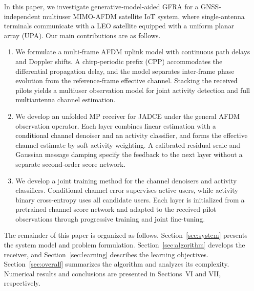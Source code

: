 In this paper, we investigate generative-model-aided GFRA for a
GNSS-independent multiuser MIMO-AFDM satellite IoT system, where
single-antenna terminals communicate with a LEO satellite equipped with
a uniform planar array (UPA). Our main contributions are as follows.
\begin{enumerate}[label=\arabic*)]
\item We formulate a multi-frame AFDM uplink model with continuous path
delays and Doppler shifts. A chirp-periodic prefix (CPP) accommodates
the differential propagation delay, and the model separates
inter-frame phase evolution from the reference-frame effective
channel. Stacking the received pilots yields a multiuser observation
model for joint activity detection and full multiantenna channel
estimation.

\item We develop an unfolded MP receiver for JADCE under the general
AFDM observation operator. Each layer combines linear estimation with
a conditional channel denoiser and an activity classifier, and forms
the effective channel estimate by soft activity weighting. A calibrated
residual scale and Gaussian message damping specify the feedback to
the next layer without a separate second-order score network.

\item We develop a joint training method for the channel denoisers
and activity classifiers. Conditional channel error supervises active
users, while activity binary cross-entropy uses all candidate users.
Each layer is initialized from a pretrained channel score network and
adapted to the received pilot observations through progressive training
and joint fine-tuning.
\end{enumerate}


The remainder of this paper is organized as follows.
Section~\ref{sec:system} presents the system model and problem
formulation. Section~\ref{sec:algorithm} develops the receiver, and
Section~\ref{sec:learning} describes the learning objectives.
Section~\ref{sec:overall} summarizes the algorithm and analyzes its
complexity. Numerical results and conclusions are presented in
Sections~VI and VII, respectively.
